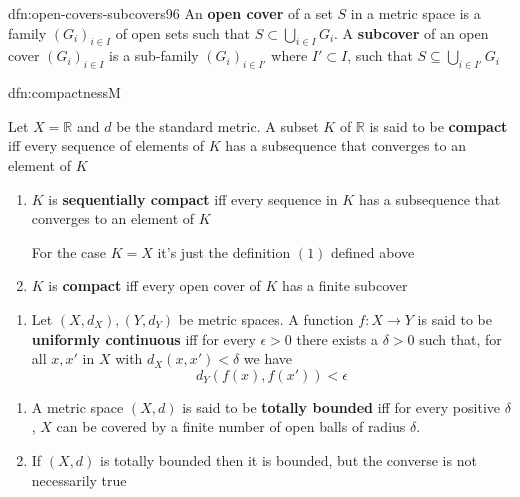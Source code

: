 \documentclass[landscape, 8pt]{extarticle}
\begin{document}
\begin{multicols}{3}
\begin{dfn}{dfn:open-covers-subcovers}{96}
    \vspace{-5pt}
    An \textbf{open cover} of a set $S$ in a metric space is a family $(G_{i})_{i\in I}$ of open sets such that $S \subset \bigcup\limits_{i \in I} G_{i}$. A \textbf{subcover} of an open cover $(G_{i})_{i\in I}$ is a sub-family $(G_{i})_{i\in I'}$ where $I' \subset I$, such that $S \subseteq \bigcup_{i\in I'} G_{i}$
\end{dfn}

\begin{dfn}{dfn:compactness}{M}
    \vspace{-5pt}

    \vspace{-2pt}
    Let $X = \mathbb{R}$ and $d$ be the standard metric. A subset $K$ of $\mathbb{R}$ is said to be \textbf{compact} iff every sequence of elements of $K$ has a subsequence that converges to an element of $K$

    \vspace{-8pt}
    \begin{enumerate}[leftmargin=*]
        \item $K$ is \textbf{sequentially compact} iff every sequence in $K$ has a subsequence that converges to an element of $K$

            For the case $K = X$ it's just the definition $(1)$ defined above
        \item $K$ is \textbf{compact} iff every open cover of $K$ has a finite subcover
    \end{enumerate}

    \vspace{-5pt}
    \vspace{-8pt}
    \begin{enumerate}[leftmargin=*]
        \item[3.] Let $(X, d_{X}), (Y, d_{Y})$ be metric spaces. A function $f : X \to Y$ is said to be \textbf{uniformly continuous} iff for every $\epsilon>0$ there exists a $\delta>0$ such that, for all $x, x'$ in $X$ with $d_{X}(x, x') < \delta$ we have
            \[d_{Y}(f(x), f(x')) < \epsilon\]
    \end{enumerate}

    \vspace{-3pt}
    \vspace{-8pt}
    \begin{enumerate}[leftmargin=*]
        \item[\textbf{117}:] A metric space $(X, d)$ is said to be \textbf{totally bounded} iff for every positive $\delta$, $X$ can be covered by a finite number of open balls of radius $\delta$.
        \item[\textbf{118}:] If $(X, d)$ is totally bounded then it is bounded, but the converse is not necessarily true
    \end{enumerate}
    

\end{dfn}
\end{multicols}
\end{document}
